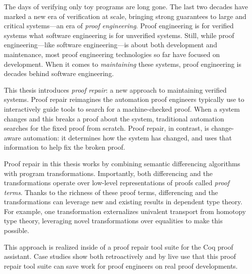 \documentclass[ twoside,openright,titlepage,numbers=noenddot,headinclude,
                footinclude=true,cleardoublepage=empty,abstractoff,%
                BCOR=5mm,paper=letter,fontsize=11pt,letterpaper,%
                american,%
                ]{scrreprt}
\begin{document}
The days of verifying only toy programs are long gone.
The last two decades have marked a new era of verification at scale, bringing strong guarantees to large and critical systems---an era of \textit{proof engineering}.
Proof engineering is for verified systems what software engineering is for unverified systems.
Still, while proof engineering---like software engineering---is about both development and maintenance, most proof engineering technologies so far 
have focused on development.
When it comes to \textit{maintaining} these systems, proof engineering is decades behind software engineering.

This thesis introduces \textit{proof repair}: a new approach to maintaining verified systems.
Proof repair reimagines the automation proof engineers typically use to interactively guide tools to
search for a machine-checked proof.
When a system changes and this breaks a proof about the system, traditional automation searches for the fixed proof from scratch.
Proof repair, in contrast, is change-aware automation: it determines how the system has changed, and uses that information to help fix the broken proof.

Proof repair in this thesis works by combining semantic differencing algorithms with program transformations.
Importantly, both differencing and the transformations operate over low-level representations of proofs called \textit{proof terms}.
Thanks to the richness of these proof terms, differencing and the transformations can leverage new and existing results in dependent type theory.
For example, one transformation externalizes univalent transport from homotopy type theory,
leveraging novel transformations over equalities to make this possible.

This approach is realized inside of a proof repair tool suite for the Coq proof assistant.
Case studies show both retroactively and by live use that this proof repair tool suite can save work for proof engineers on real proof developments.
\end{document}
